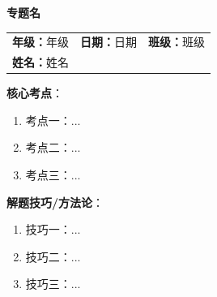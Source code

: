 \providecommand{\zhuantiName}{专题名}
\providecommand{\zhuantiGrade}{年级}
\providecommand{\zhuantiDate}{日期}
\providecommand{\zhuantiClass}{班级}
\providecommand{\zhuantiStudent}{姓名}
\providecommand{\tierNames}{基础巩固,能力提高,拔高挑战}
\providecommand{\mcqItemSep}{0.3em}
\providecommand{\msqItemSep}{0.5em}
\providecommand{\blankItemSep}{0.8em}
\providecommand{\saqItemSep}{2.5cm}
\providecommand{\mcqTasksCols}{4}
\providecommand{\msqTasksCols}{2}

\providecommand{\tierA}{基础巩固}
\providecommand{\tierB}{能力提高}
\providecommand{\tierC}{拔高挑战}
\providecommand{\tierD}{}

\begin{center}
    \LARGE\textbf{\zhuantiName}
\end{center}
\vspace{0.5em}

\noindent\begin{tabular}{@{}p{}p{}p{}@{}}
    \textbf{年级：}\zhuantiGrade & \textbf{日期：}\zhuantiDate & \textbf{班级：}\zhuantiClass \\
    \textbf{姓名：}\zhuantiStudent & & \\
\end{tabular}
\vspace{1em}

\begin{keypoints}
    \textbf{核心考点}：
    \begin{enumerate}[label=\arabic*., leftmargin=2em, itemsep=0.2em]
        \item 考点一：...
        \item 考点二：...
        \item 考点三：...
    \end{enumerate}

    \textbf{解题技巧/方法论}：
    \begin{enumerate}[label=\arabic*., leftmargin=2em, itemsep=0.2em]
        \item 技巧一：...
        \item 技巧二：...
        \item 技巧三：...
    \end{enumerate}
\end{keypoints}

